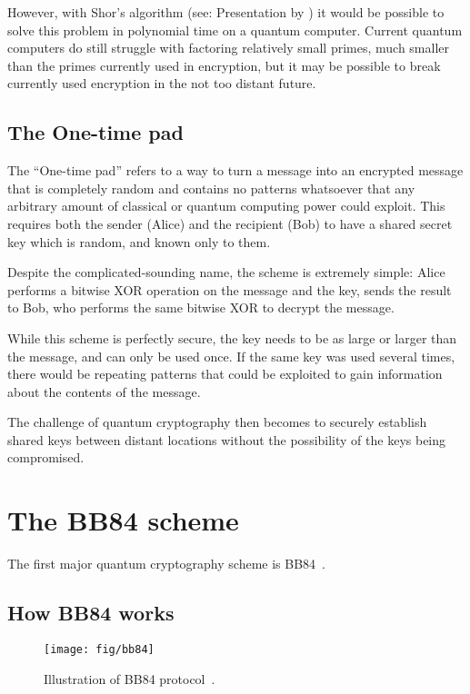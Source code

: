 \documentclass[12pt]{article}
\begin{document}
However, with Shor's algorithm (see: Presentation by \citet{photonic}) it would be possible to solve this problem in polynomial time on a quantum computer.
Current quantum computers do still struggle with factoring relatively small primes, much smaller than the primes currently used in encryption, but it may be possible to break currently used encryption in the not too distant future.

\subsection{The One-time pad}

The ``One-time pad'' refers to a way to turn a message into an encrypted message that is completely random and contains no patterns whatsoever that any arbitrary amount of classical or quantum computing power could exploit.
This requires both the sender (Alice) and the recipient (Bob) to have a shared secret key which is random, and known only to them.

Despite the complicated-sounding name, the scheme is extremely simple:
Alice performs a bitwise XOR operation on the message and the key, sends the result to Bob, who performs the same bitwise XOR to decrypt the message.

While this scheme is perfectly secure, the key needs to be as large or larger than the message, and can only be used once.
If the same key was used several times, there would be repeating patterns that could be exploited to gain information about the contents of the message.

The challenge of quantum cryptography then becomes to securely establish shared keys between distant locations without the possibility of the keys being compromised.

\section{The BB84 scheme}

The first major quantum cryptography scheme is BB84~\citep{bennett1984quantum}.

\subsection{How BB84 works}


\begin{figure}[h]
	\centering
	\texttt{[image: fig/bb84]}
	\caption{Illustration of BB84 protocol~\citep{Carrasco_Casado_2016}.}
	\label{fig:bb84}
\end{figure}
\end{document}
